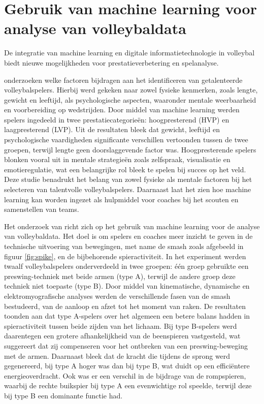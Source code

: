 \section{Gebruik van machine learning voor analyse van volleybaldata}
De integratie van machine learning en digitale informatietechnologie in volleybal biedt nieuwe mogelijkheden voor prestatieverbetering en spelanalyse.

\textcite{Musa2021} onderzoeken welke factoren bijdragen aan het identificeren van getalenteerde volleybalspelers. Hierbij werd gekeken naar zowel fysieke kenmerken, zoals lengte, gewicht en leeftijd, als psychologische aspecten, waaronder mentale weerbaarheid en voorbereiding op wedstrijden. Door middel van machine learning werden spelers ingedeeld in twee prestatiecategorieën: hoogpresterend (HVP) en laagpresterend (LVP).
Uit de resultaten bleek dat gewicht, leeftijd en psychologische vaardigheden significante verschillen vertoonden tussen de twee groepen, terwijl lengte geen doorslaggevende factor was. Hoogpresterende spelers blonken vooral uit in mentale strategieën zoals zelfspraak, visualisatie en emotieregulatie, wat een belangrijke rol bleek te spelen bij succes op het veld.
Deze studie benadrukt het belang van zowel fysieke als mentale factoren bij het selecteren van talentvolle volleybalspelers. Daarnaast laat het zien hoe machine learning kan worden ingezet als hulpmiddel voor coaches bij het scouten en samenstellen van teams.

Het onderzoek van \textcite{Dai2021} richt zich op het gebruik van machine learning voor de analyse van volleybaldata. Het doel is om spelers en coaches meer inzicht te geven in de technische uitvoering van bewegingen, met name de smash zoals afgebeeld in figuur \ref{fig:spike}, en de bijbehorende spieractiviteit. In het experiment werden twaalf volleybalspelers onderverdeeld in twee groepen: één groep gebruikte een preswing-techniek met beide armen (type A), terwijl de andere groep deze techniek niet toepaste (type B).
Door middel van kinematische, dynamische en elektromyografische analyses werden de verschillende fasen van de smash bestudeerd, van de aanloop en afzet tot het moment van raken. De resultaten toonden aan dat type A-spelers over het algemeen een betere balans hadden in spieractiviteit tussen beide zijden van het lichaam. Bij type B-spelers werd daarentegen een grotere afhankelijkheid van de beenspieren vastgesteld, wat suggereert dat zij compenseren voor het ontbreken van een preswing-beweging met de armen.
Daarnaast bleek dat de kracht die tijdens de sprong werd gegenereerd, bij type A hoger was dan bij type B, wat duidt op een efficiëntere energieoverdracht. Ook was er een verschil in de bijdrage van de rompspieren, waarbij de rechte buikspier bij type A een evenwichtige rol speelde, terwijl deze bij type B een dominante functie had.

